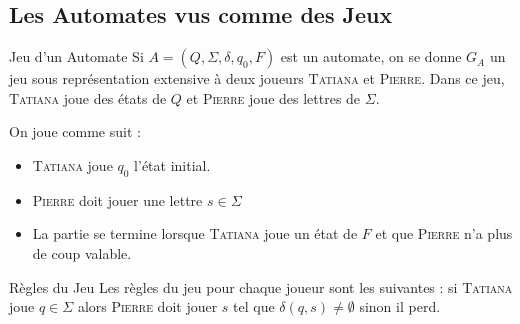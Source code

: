 \documentclass{cours}
\begin{document}
\subsection{Les Automates vus comme des Jeux}
\begin{définition}{Jeu d'un Automate}{}
    Si $A = \left(Q, \Sigma, \delta, q_{0}, F\right)$ est un automate, on se donne $G_{A}$ un jeu sous représentation extensive à deux joueurs \textsc{Tatiana} et \textsc{Pierre}. Dans ce jeu, \textsc{Tatiana} joue des états de $Q$ et \textsc{Pierre} joue des lettres de $\Sigma$.
\end{définition}
On joue comme suit :
\begin{itemize}
    \item \textsc{Tatiana} joue $q_{0}$ l'état initial.
    \item \textsc{Pierre} doit jouer une lettre $s \in \Sigma$
    \item La partie se termine lorsque \textsc{Tatiana} joue un état de $F$ et que \textsc{Pierre} n'a plus de coup valable.
\end{itemize}

\begin{définition}{Règles du Jeu}{}
    Les règles du jeu pour chaque joueur sont les suivantes : si \textsc{Tatiana} joue $q \in \Sigma$ alors \textsc{Pierre} doit jouer $s$ tel que $\delta(q, s) \neq \emptyset$ sinon il perd.
\end{définition}
\end{document}
